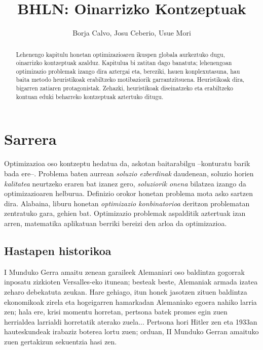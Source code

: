 \documentclass[eu]{ifirak}\usepackage[]{graphicx}\usepackage[]{color}
\begin{document}
\title{BHLN: Oinarrizko Kontzeptuak}
\date{}
\author{Borja Calvo, Josu Ceberio, Usue Mori}







\maketitle

\begin{abstract}
Lehenengo kapitulu honetan optimizazioaren ikuspen globala aurkeztuko dugu, oinarrizko kontzeptuak azalduz. Kapitulua bi zatitan dago banatuta; lehenengoan optimizazio problemak izango dira aztergai eta, bereziki, hauen konplexutasuna, hau baita metodo heuristikoak erabiltzeko motibaziorik garrantzitsuena. Heuristikoak dira, bigarren zatiaren protagonistak. Zehazki, heuristikoak diseinatzeko eta erabiltzeko kontuan eduki beharreko kontzeptuak aztertuko ditugu. 
\end{abstract}

\section{Sarrera}

Optimizazioa oso kontzeptu hedatua da, askotan baitarabilgu --konturatu barik bada ere--. Problema baten aurrean \textit{soluzio ezberdinak} daudenean, soluzio horien \textit{kalitatea} neurtzeko eraren bat izanez gero, \textit{soluziorik onena} bilatzea izango da optimizazioaren helburua. Definizio orokor honetan problema mota asko sartzen dira. Alabaina, liburu honetan \textit{optimizazio konbinatorioa} deritzon problematan zentratuko gara, gehien bat. Optimizazio problemak aspalditik aztertuak izan arren, matematika aplikatuan berriki bereizi den arloa da optimizazioa.
 

\subsection{Hastapen historikoa}
I Munduko Gerra amaitu zenean garaileek Alemaniari oso baldintza gogorrak inposatu zizkioten Versalles-eko itunean; besteak beste, Alemaniak armada izatea zeharo debekatuta zeukan. Hare gehiago, itun honek jasotzen zituen baldintza ekonomikoak zirela eta hogeigarren hamarkadan Alemaniako egoera nahiko larria zen; hala ere, krisi momentu horretan, pertsona batek promes egin zuen herrialdea larrialdi horretatik aterako zuela... Pertsona hori Hitler zen eta 1933an hauteskundeak irabaziz boterea lortu zuen; orduan, II Munduko Gerran amaituko zuen gertakizun sekuentzia hasi zen.
\end{document}
